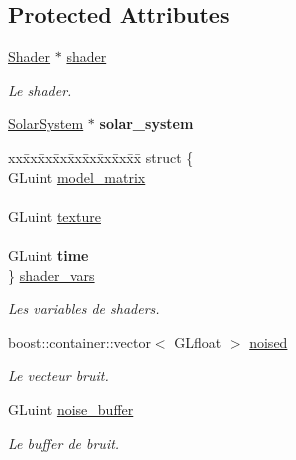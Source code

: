 \subsection*{Protected Attributes}
\begin{DoxyCompactItemize}
\item 
\mbox{\label{classSun_a08d88070ddf47ce128bf5733723fbe14}} 
\mbox{\hyperlink{classShader}{Shader}} $\ast$ \mbox{\hyperlink{classSun_a08d88070ddf47ce128bf5733723fbe14}{shader}}
\begin{DoxyCompactList}\small\item\em Le shader. \end{DoxyCompactList}\item 
\mbox{\label{classSun_a896c371f6646046efe89f11df943b162}} 
\mbox{\hyperlink{classSolarSystem}{Solar\+System}} $\ast$ {\bfseries solar\+\_\+system}
\item 
\mbox{\label{classSun_aa7b65bdd6a5cb1961a1ba6fd5519f47a}} 
\begin{tabbing}
xx\=xx\=xx\=xx\=xx\=xx\=xx\=xx\=xx\=\kill
struct \{\\
\>GLuint \mbox{\hyperlink{classSun_a0b0ae08a61f9fe139ab9a9950d5a523e}{model\_matrix}}\\
\>\\
\>GLuint \mbox{\hyperlink{classSun_aa7d24617197997c2d401cb555b3a3459}{texture}}\\
\>\\
\>GLuint {\bfseries time}\\
\} \mbox{\hyperlink{classSun_aa7b65bdd6a5cb1961a1ba6fd5519f47a}{shader\_vars}}\\

\end{tabbing}\begin{DoxyCompactList}\small\item\em Les variables de shaders. \end{DoxyCompactList}\item 
\mbox{\label{classSun_afda8a4c5b01f2fa18417afeef49f207e}} 
boost\+::container\+::vector$<$ G\+Lfloat $>$ \mbox{\hyperlink{classSun_afda8a4c5b01f2fa18417afeef49f207e}{noised}}
\begin{DoxyCompactList}\small\item\em Le vecteur bruit. \end{DoxyCompactList}\item 
\mbox{\label{classSun_af510fc764453d8576fb77f200b8b68af}} 
G\+Luint \mbox{\hyperlink{classSun_af510fc764453d8576fb77f200b8b68af}{noise\+\_\+buffer}}
\begin{DoxyCompactList}\small\item\em Le buffer de bruit. \end{DoxyCompactList}\end{DoxyCompactItemize}
